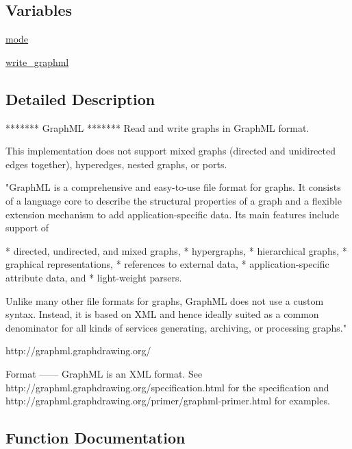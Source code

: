 \subsection*{Variables}
\begin{DoxyCompactItemize}
\item 
\hyperlink{namespacenetworkx_1_1readwrite_1_1graphml_afaaee57deeaba21fc4c70f107fe39da1}{mode}
\item 
\hyperlink{namespacenetworkx_1_1readwrite_1_1graphml_a50907e2aab4ec16b4d6a25916ef67bb7}{write\+\_\+graphml}
\end{DoxyCompactItemize}


\subsection{Detailed Description}
\begin{DoxyVerb}*******
GraphML
*******
Read and write graphs in GraphML format.

This implementation does not support mixed graphs (directed and unidirected
edges together), hyperedges, nested graphs, or ports.

"GraphML is a comprehensive and easy-to-use file format for graphs. It
consists of a language core to describe the structural properties of a
graph and a flexible extension mechanism to add application-specific
data. Its main features include support of

    * directed, undirected, and mixed graphs,
    * hypergraphs,
    * hierarchical graphs,
    * graphical representations,
    * references to external data,
    * application-specific attribute data, and
    * light-weight parsers.

Unlike many other file formats for graphs, GraphML does not use a
custom syntax. Instead, it is based on XML and hence ideally suited as
a common denominator for all kinds of services generating, archiving,
or processing graphs."

http://graphml.graphdrawing.org/

Format
------
GraphML is an XML format.  See
http://graphml.graphdrawing.org/specification.html for the specification and
http://graphml.graphdrawing.org/primer/graphml-primer.html
for examples.
\end{DoxyVerb}
 

\subsection{Function Documentation}
\mbox{\label{namespacenetworkx_1_1readwrite_1_1graphml_ae3cad67ecd404c7d3c5aa7e3a960c698}} 
